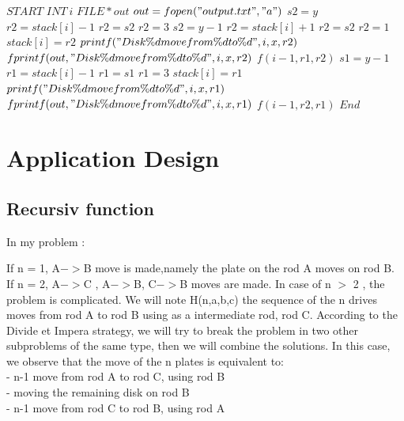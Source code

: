 \documentclass[12]{article}
\begin{document}
\begin{algorithmic}
\STATE $START$
\STATE $INT \ i$  
\STATE $FILE *out$
\STATE $out = fopen("output.txt","a")$
            \STATE $s2 = y$
                \STATE $r2 = stack[i]-1$
            \ELSE
                \STATE $r2 = s2$
            \ENDIF
                \STATE $r2 = 3$
            \ENDIF
        \ENDIF
        \ELSE
            \STATE $s2 = y-1$
                \STATE $r2 = stack[i]+1$
            \ELSE
                \STATE $r2 = s2$
            \ENDIF
                \STATE $r2 = 1$
            \ENDIF
        \STATE $stack[i] = r2$
        \STATE $printf("Disk \%d move from \%d to \%d",i,x,r2)$
        \STATE $fprintf(out,"Disk \%d move from \%d to \%d",i,x,r2)$
        \STATE $f(i-1, r1, r2)$
        \ENDIF
        \ELSE
                \STATE $s1 = y-1$
            \ENDIF
                    \STATE $r1 = stack[i]-1$
                \ELSE
                    \STATE $r1 = s1$
                \ENDIF
                    \STATE $r1 = 3$
                \ENDIF
        \STATE $stack[i] = r1$
        \STATE $printf("Disk \%d move from \%d to \%d",i,x,r1)$
        \STATE $fprintf(out ,"Disk \%d move from \%d to \%d",i,x,r1 )$
        \STATE $f(i-1, r2, r1)$
    \ENDIF
\ENDFOR
\STATE $End$
\end{algorithmic}


\newpage
\section{Application Design}
\textbf{}

\subsection{Recursiv function}

In my problem : 

If n = 1,  A$->$B move is made,namely the plate on the rod A moves on rod B. 
If n = 2,  A$->$C , A$->$B, C$->$B moves are made. 
In case of n $>$ 2 , the problem is complicated. 
We will note H(n,a,b,c) the sequence of the n drives moves from rod A to rod B using as a intermediate rod, rod C. 
According to the Divide et Impera strategy, we will try to break the problem in two other subproblems of the same type, then we will combine the solutions. In this case, we observe that the move of the n plates is equivalent to: \\
- n-1 move from rod A to rod C, using rod B \\
- moving the remaining disk on rod B \\
- n-1 move from rod C to rod B, using rod A
\end{document}
